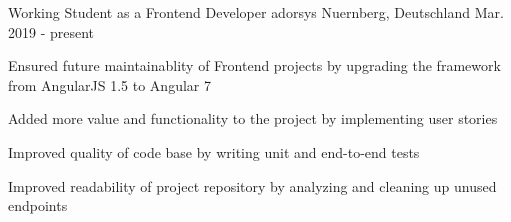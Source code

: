 
\begin{cventries}


  \cventry
    {Working Student as a Frontend Developer} %
    {adorsys} %
    {Nuernberg, Deutschland} %
    {Mar. 2019	 - present} %
    {
      \begin{cvitems} %
        \item {Ensured future maintainablity of Frontend projects by upgrading the framework from AngularJS 1.5 to Angular 7}
        \item {Added more value and functionality to the project by implementing user stories}
        \item {Improved quality of code base by writing unit and end-to-end tests}
        \item {Improved readability of project repository by analyzing and cleaning up unused endpoints}
      \end{cvitems}
    }

\end{cventries}
